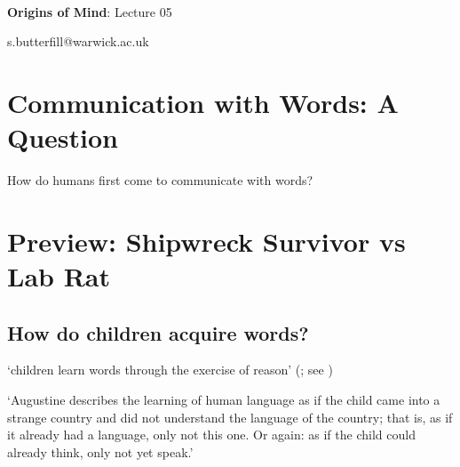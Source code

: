\documentclass[12pt]{extarticle}
\date{}
\makeatletter
\def \ititle {Origins of Mind}
\def \isubtitle {Lecture 02}
\def \iemail{s.butterfill@warwick.ac.uk}
\makeatother
\begin{document}
\begin{multicols}{3}

\setlength\footnotesep{1em}







\def \ititle {Origins of Mind}
 
\def \isubtitle {Lecture 05}
 
 
 
\
 
 
 
\begin{center}
 
{\Large
 
\textbf{\ititle}: \isubtitle
 
}
 
 
 
\iemail %
 
\end{center}
 
 
 
\section{Communication with Words: A Question}
How do humans first come to communicate with words?

 
 
 
\section{Preview: Shipwreck Survivor vs Lab Rat}
 
\subsection{How do children acquire words?}
 
‘children learn words through the exercise of reason’
(\citealp[p.\ 1103]{Bloom:2001ka}; see \citealp{Bloom:2000qz})
 
‘Augustine describes the learning of human language as if the child came into a strange country and did not understand the language of the country; that is, as if it already had a language, only not this one. Or again: as if the child could already think, only not yet speak.’
\citep[15--16, §32]{Wittgenstein:1953mm}
 

\end{multicols}
\end{document}
